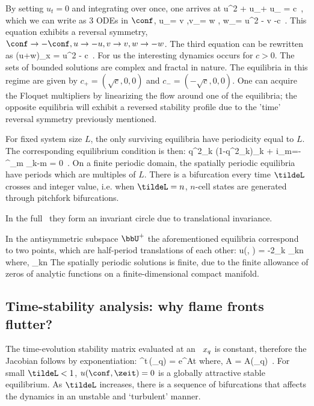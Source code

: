 By setting $u_t = 0$ and integrating over  once, one arrives at
\beq
{}u^2 + u_\conf + u_{\conf \conf \conf} = c
\,,
\eeq
which we can write as $3$ ODEs in $\conf$,
\beq
u_\conf = v ,\quad v_\conf = w , \quad w_\conf = u^2 - v -c
\,.
\eeq
This equation exhibits a reversal symmetry, $\conf \rightarrow
-\conf , u \rightarrow -u , v \rightarrow v , w \rightarrow -w$.
The third equation can be rewritten as
\beq
(u+w)_x = u^2 - c
\,.
\eeq
For us the interesting dynamics occurs for $c>0$. The sets of bounded
solutions are complex and fractal in nature. The equilibria in this
regime are given by $c_+ = (\sqrt{c},0,0)$ and $c_- = (-\sqrt{c},0,0)$.
One can acquire the Floquet multipliers by linearizing the flow around
one of the equilibria; the opposite equilibria will exhibit a reversed
stability profile due to the 'time' reversal symmetry previously
mentioned.

For fixed system size $L$, the only surviving equilibria have periodicity
equal to $L$. The corresponding equilibrium condition is then:
\beq
q^2_k (1-q^2_k)\Fu_k + i\sum_{m=-\infty}^{\infty}\Fu_m \Fu_{k-m} = 0
\,.
\eeq
On a finite periodic domain, the spatially periodic equilibria have periods which
are multiples of $L$. There is a bifurcation every time $\tildeL$
crosses and integer value, i.e. when $\tildeL = n$, $n$-cell states are
generated through pitchfork bifurcations.

In the full \statesp\ they form an invariant circle due to translational
invariance.

In the antisymmetric subspace $\bbU^+$ the aforementioned equilibria
correspond to two points, which are half-period translations of each
other:
\beq
\nonumber
u(\conf, \zeit) = -2\sum_k \Fu_{kn} \quad \mbox{where,} \quad \Fu_{kn} \in {}
\eeq
The spatially periodic solutions is finite, due to the finite allowance
of zeros of analytic functions on a finite-dimensional compact manifold.

\subsection{Time-stability analysis: why flame fronts flutter?}
\label{sect:MNGtimeStab}


The time-evolution stability matrix evaluated at an \eqv\ $x_q$ is
constant, therefore the Jacobian follows by exponentiation:
\beq
\nonumber
\J^{t}\,(\ssp_q) = e^{At} \quad \mbox{where,} \quad A = A(\ssp_q)
\,.
\eeq
For small $\tildeL<1$, $u(\conf, \zeit) = 0$ is a globally attractive
stable equilibrium. As $\tildeL$ increases, there is a sequence of
bifurcations that affects the dynamics in an unstable and `turbulent'
manner.

